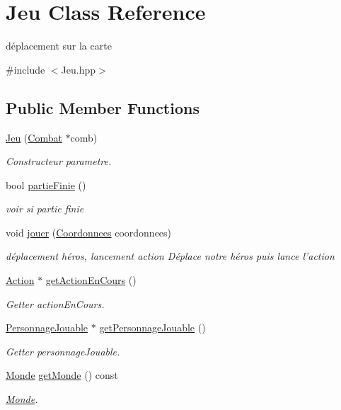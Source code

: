 \hypertarget{classJeu}{\section{Jeu Class Reference}
\label{classJeu}
}


déplacement sur la carte  




{\ttfamily \#include $<$Jeu.\-hpp$>$}

\subsection*{Public Member Functions}
\begin{DoxyCompactItemize}
\item 
\hyperlink{classJeu_a631b0ba2e7be229fe4753f21a945169f}{Jeu} (\hyperlink{classCombat}{Combat} $\ast$comb)
\begin{DoxyCompactList}\small\item\em Constructeur parametre. \end{DoxyCompactList}\item 
bool \hyperlink{classJeu_a9aeb73667d13bf323fbeae0452164e25}{partie\-Finie} ()
\begin{DoxyCompactList}\small\item\em voir si partie finie \end{DoxyCompactList}\item 
\hypertarget{classJeu_a7a53f9ad522f2d315c4772ea298a2ebd}{void \hyperlink{classJeu_a7a53f9ad522f2d315c4772ea298a2ebd}{jouer} (\hyperlink{classCoordonnees}{Coordonnees} coordonnees)}\label{classJeu_a7a53f9ad522f2d315c4772ea298a2ebd}

\begin{DoxyCompactList}\small\item\em déplacement héros, lancement action Déplace notre héros puis lance l'action \end{DoxyCompactList}\item 
\hyperlink{classAction}{Action} $\ast$ \hyperlink{classJeu_ad20b3695183c5f09e650adef593791f3}{get\-Action\-En\-Cours} ()
\begin{DoxyCompactList}\small\item\em Getter action\-En\-Cours. \end{DoxyCompactList}\item 
\hyperlink{classPersonnageJouable}{Personnage\-Jouable} $\ast$ \hyperlink{classJeu_a43406840720ad6938890f5e212295e4b}{get\-Personnage\-Jouable} ()
\begin{DoxyCompactList}\small\item\em Getter personnage\-Jouable. \end{DoxyCompactList}\item 
\hyperlink{classMonde}{Monde} \hyperlink{classJeu_af42015551eab7e585e8006454bdd7673}{get\-Monde} () const 
\begin{DoxyCompactList}\small\item\em \hyperlink{classMonde}{Monde}. \end{DoxyCompactList}\end{DoxyCompactItemize}


